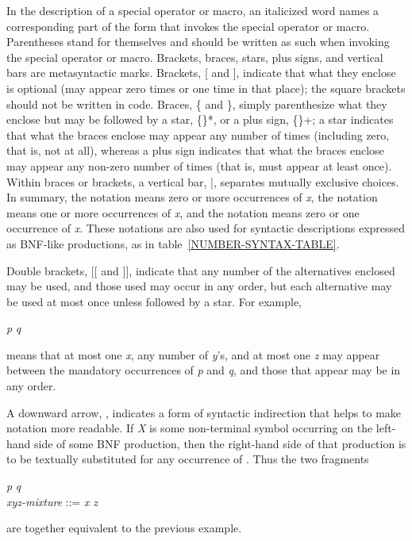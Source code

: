In the description of a special operator or macro, an italicized word names a
corresponding part of the form that invokes the special operator or macro.
Parentheses stand for themselves and should be
written as such when invoking the special operator or macro.
Brackets, braces, stars, plus signs, and vertical bars are metasyntactic
marks. 
Brackets,
[ and ], indicate that what they enclose is optional
(may appear zero times or one time in that place); the square
brackets should not be written in code.
Braces, \{ and \}, simply parenthesize what they enclose
but may be followed by a star, \{\}*, or a plus sign, \{\}+;
a star indicates that what the braces enclose may appear any number of times
(including zero, that is, not at all), whereas a plus sign indicates
that what the braces enclose may appear any non-zero number of times
(that is, must appear at least once).  Within braces or brackets,
a vertical bar, |, separates mutually exclusive choices.
In summary, the notation  means zero or more occurrences
of \emph{x}, the notation  means one or more occurrences
of \emph{x}, and the notation  means zero or one occurrence
of \emph{x}.  These notations are also used for syntactic
descriptions expressed as BNF-like productions, as
in table~\ref{NUMBER-SYNTAX-TABLE}.

Double brackets, [[ and ]], indicate that any number of the
alternatives enclosed may be used, and those used
may occur in any order, but each
alternative may be used at most once unless followed by a star.
For example,
\begin{tabbing}
\emph{p}  \emph{q}
\end{tabbing}
means that
at most one \emph{x}, any number of \emph{y}'s, and at most one \emph{z}
may appear between the mandatory occurrences of \emph{p}
and \emph{q}, and those that appear may be in any order.

A downward arrow, \Mind{}, indicates a form of syntactic indirection
that helps to make \Mchoice{~} notation more readable.  If \emph{X} is
some non-terminal symbol occurring on the left-hand side of some BNF
production, then the right-hand
side of that production is to be textually substituted for any occurrence
of .  Thus the two fragments
\begin{tabbing}
\emph{p}  \emph{q} \\
\emph{xyz-mixture} ::= \emph{x\/} {\Mor}  {\Mor} \emph{z\/}
\end{tabbing}
are together equivalent to the previous example.

